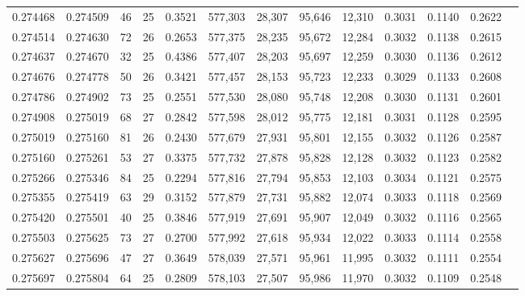 \begin{tabular}{rrrrrrrrrrrrr}
0.274468 & 0.274509 &  46 &  25 &                                     0.3521 & 577,303 &  28,307 &  95,646 &  12,310 & 0.3031 & 0.1140 & 0.2622 \\
0.274514 & 0.274630 &  72 &  26 &                                     0.2653 & 577,375 &  28,235 &  95,672 &  12,284 & 0.3032 & 0.1138 & 0.2615 \\
0.274637 & 0.274670 &  32 &  25 &                                     0.4386 & 577,407 &  28,203 &  95,697 &  12,259 & 0.3030 & 0.1136 & 0.2612 \\
0.274676 & 0.274778 &  50 &  26 &                                     0.3421 & 577,457 &  28,153 &  95,723 &  12,233 & 0.3029 & 0.1133 & 0.2608 \\
0.274786 & 0.274902 &  73 &  25 &                                     0.2551 & 577,530 &  28,080 &  95,748 &  12,208 & 0.3030 & 0.1131 & 0.2601 \\
0.274908 & 0.275019 &  68 &  27 &                                     0.2842 & 577,598 &  28,012 &  95,775 &  12,181 & 0.3031 & 0.1128 & 0.2595 \\
0.275019 & 0.275160 &  81 &  26 &                                     0.2430 & 577,679 &  27,931 &  95,801 &  12,155 & 0.3032 & 0.1126 & 0.2587 \\
0.275160 & 0.275261 &  53 &  27 &                                     0.3375 & 577,732 &  27,878 &  95,828 &  12,128 & 0.3032 & 0.1123 & 0.2582 \\
0.275266 & 0.275346 &  84 &  25 &                                     0.2294 & 577,816 &  27,794 &  95,853 &  12,103 & 0.3034 & 0.1121 & 0.2575 \\
0.275355 & 0.275419 &  63 &  29 &                                     0.3152 & 577,879 &  27,731 &  95,882 &  12,074 & 0.3033 & 0.1118 & 0.2569 \\
0.275420 & 0.275501 &  40 &  25 &                                     0.3846 & 577,919 &  27,691 &  95,907 &  12,049 & 0.3032 & 0.1116 & 0.2565 \\
0.275503 & 0.275625 &  73 &  27 &                                     0.2700 & 577,992 &  27,618 &  95,934 &  12,022 & 0.3033 & 0.1114 & 0.2558 \\
0.275627 & 0.275696 &  47 &  27 &                                     0.3649 & 578,039 &  27,571 &  95,961 &  11,995 & 0.3032 & 0.1111 & 0.2554 \\
0.275697 & 0.275804 &  64 &  25 &                                     0.2809 & 578,103 &  27,507 &  95,986 &  11,970 & 0.3032 & 0.1109 & 0.2548 \\

\end{tabular}
